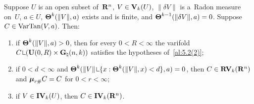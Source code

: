 \begin{theorem}
    \label{al:6.5}
    Suppose $U$ is an open subset of~$\mathbf{R}^{n}$, $V \in \mathbf{V}_{k}(U)$, $\|\delta V\|$ is
    a~Radon measure on~$U$, $a \in U$, $\boldsymbol{\Theta}^{k}(\|V\|,a)$ exists and is finite, and
    $\boldsymbol{\Theta}^{k-1}(\|\delta V\|,a) = 0$. Suppose $C \in \operatorname{VarTan}(V,a)$. Then:
    \begin{enumerate}
        \item if $\boldsymbol{\Theta}^{k}(\|V\|,a) > 0$, then for every $0 < R < \infty$ the varifold $C
            \restrict (\oball{0}{R} \times \pgrass{\adim}{\vdim})$ satisfies the hypotheses
            of~\ref{al:5.2(2)};
        \item if $0 < d < \infty$ and $\density^{\vdim}(\|V\| \restrict \{ x :
            \density^{\vdim}(\|V\|,x) < d \}, a) = 0$, then $C \in \mathbf{RV}_{k}(\mathbf{R}^{n})$ and
            $\boldsymbol{\mu}_{r \#} C = C$ for $0 < r < \infty$;
        \item if $V \in \mathbf{IV}_{k}(U)$, then $C \in \mathbf{IV}_{k}(\mathbf{R}^{n})$.
    \end{enumerate}
\end{theorem}

